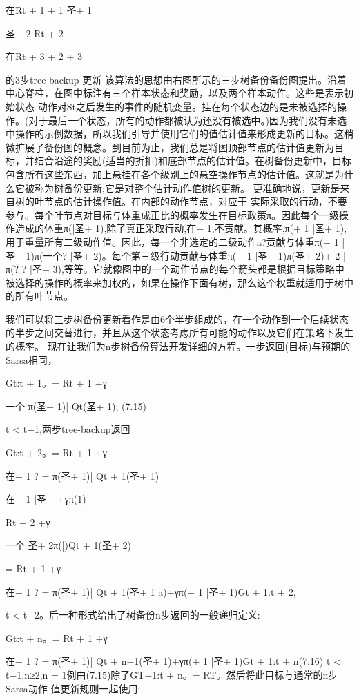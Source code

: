 在Rt + 1 + 1
圣+ 1



圣+ 2
Rt + 2



在Rt + 3 + 2 + 3


的3步tree-backup
更新
该算法的思想由右图所示的三步树备份备份图提出。沿着中心脊柱，在图中标注有三个样本状态和奖励，以及两个样本动作。这些是表示初始状态-动作对St之后发生的事件的随机变量。挂在每个状态边的是未被选择的操作。(对于最后一个状态，所有的动作都被认为还没有被选中。)因为我们没有未选中操作的示例数据，所以我们引导并使用它们的值估计值来形成更新的目标。这稍微扩展了备份图的概念。到目前为止，我们总是将图顶部节点的估计值更新为目标，并结合沿途的奖励(适当的折扣)和底部节点的估计值。在树备份更新中，目标包含所有这些东西，加上悬挂在各个级别上的悬空操作节点的估计值。这就是为什么它被称为树备份更新;它是对整个估计动作值树的更新。
更准确地说，更新是来自树的叶节点的估计操作值。在内部的动作节点，对应于
实际采取的行动，不要参与。每个叶节点对目标与体重成正比的概率发生在目标政策π。因此每个一级操作造成的体重π(|圣+ 1),除了真正采取行动,在+ 1,不贡献。其概率,π(+ 1 |圣+ 1),用于重量所有二级动作值。因此，每一个非选定的二级动作a?贡献与体重π(+ 1 |圣+ 1)π(一个? |圣+ 2)。每个第三级行动贡献与体重π(+ 1 |圣+ 1)π(圣+ 2)+ 2 |π(? ? |圣+ 3),等等。它就像图中的一个动作节点的每个箭头都是根据目标策略中被选择的操作的概率来加权的，如果在操作下面有树，那么这个权重就适用于树中的所有叶节点。

我们可以将三步树备份更新看作是由6个半步组成的，在一个动作到一个后续状态的半步之间交替进行，并且从这个状态考虑所有可能的动作以及它们在策略下发生的概率。
现在让我们为n步树备份算法开发详细的方程。一步返回(目标)与预期的Sarsa相同，

Gt:t + 1。= Rt + 1 +γ

一个
π(圣+ 1)| Qt(圣+ 1), 					(7.15)

t < t−1,两步tree-backup返回

Gt:t + 2。= Rt + 1 +γ

在+ 1 ? =
π(圣+ 1)| Qt + 1(圣+ 1)

在+ 1 |圣+ +γπ(1)

Rt + 2 +γ

一个
圣+ 2π(|)Qt + 1(圣+ 2)

= Rt + 1 +γ

在+ 1 ? =
π(圣+ 1)| Qt + 1(圣+ 1 a)+γπ(+ 1 |圣+ 1)Gt + 1:t + 2,


t < t−2。后一种形式给出了树备份n步返回的一般递归定义:

Gt:t + n。= Rt + 1 +γ

在+ 1 ? =
π(圣+ 1)| Qt + n−1(圣+ 1)+γπ(+ 1 |圣+ 1)Gt + 1:t + n(7.16)
t < t−1,n≥2,n = 1例由(7.15)除了GT−1:t + n。= RT。然后将此目标与通常的n步Sarsa动作-值更新规则一起使用:


